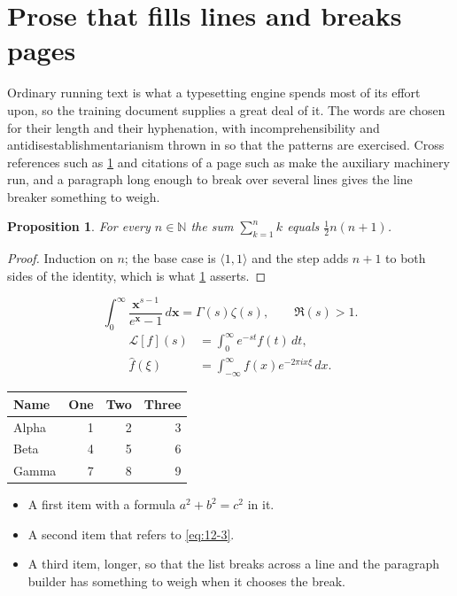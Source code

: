 \documentclass[11pt,a4paper]{report}
\theoremstyle{plain}
\newtheorem{proposition}{Proposition}[chapter]
\newcommand{\vecn}[1]{\mathbf{#1}}
\newcommand{\pairs}[2]{\langle #1,#2\rangle}
\begin{document}
\section{Prose that fills lines and breaks pages}
\label{sec:prose12-3}
Ordinary running text is what a typesetting engine spends most of its effort
upon, so the training document supplies a great deal of it. The words are
chosen for their length and their hyphenation, with incomprehensibility and
antidisestablishmentarianism thrown in so that the patterns are exercised.
Cross references such as \cref{sec:prose12-3} and citations of a page such
as \pageref{sec:prose12-3} make the auxiliary machinery run, and a
paragraph long enough to break over several lines gives the line breaker
something to weigh.
\begin{proposition}\label{prop:12-3}
For every $n\in\mathbb{N}$ the sum $\sum_{k=1}^{n}k$ equals
$\tfrac{1}{2}n(n+1)$.
\end{proposition}
\begin{proof}
Induction on $n$; the base case is $\pairs{1}{1}$ and the step adds $n+1$ to
both sides of the identity, which is what \cref{prop:12-3} asserts.
\end{proof}
\begin{equation}\label{eq:12-3}
  \int_{0}^{\infty}\frac{\vecn{x}^{s-1}}{e^{\vecn{x}}-1}\,d\vecn{x}
    = \Gamma(s)\zeta(s),\qquad \Re(s)>1 .
\end{equation}
\begin{align}
  \mathcal{L}[f](s) &= \int_{0}^{\infty} e^{-st} f(t)\,dt, \\
  \widehat{f}(\xi)  &= \int_{-\infty}^{\infty} f(x) e^{-2\pi i x\xi}\,dx .
\end{align}
\par\noindent\begin{center}
\begin{tabular}{lrrr}
\hline
Name & One & Two & Three \\
\hline
Alpha & 1 & 2 & 3 \\
Beta & 4 & 5 & 6 \\
Gamma & 7 & 8 & 9 \\
\hline
\end{tabular}
\end{center}
\begin{itemize}
  \item A first item with a formula $a^2+b^2=c^2$ in it.
  \item A second item that refers to \eqref{eq:12-3}.
  \item A third item, longer, so that the list breaks across a line and the
    paragraph builder has something to weigh when it chooses the break.
\end{itemize}
\end{document}
